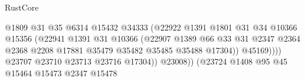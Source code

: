 \begin{lexlean}{RustCore}
\begin{coremodule}
                                                  @1809
                                                  @31
                                                  @35
                                                  @6314
                                                  @15432
                                                  @34333
                                                  (@22922
                                                    @1391
                                                    @1801
                                                    @31
                                                    @34
                                                    @10366
                                                    @15356
                                                    (@22941
                                                      @1391
                                                      @31
                                                      @10366
                                                      (@22907
                                                        @1389
                                                        @66
                                                        @33
                                                        @31
                                                        @2347
                                                        @2364
                                                        @2368
                                                        @2208
                                                        @17881
                                                        @35479
                                                        @35482
                                                        @35485
                                                        @35488
                                                        @17304))
                                                    @45169))))
                                            @23707
                                            @23710
                                            @23713
                                            @23716
                                            @17304))
                                        @23008))
                                    (@23724
                                      @1408
                                      @95
                                      @45
                                      @15464
                                      @15473
                                      @2347
                                      @15478

\end{coremodule}
\end{lexlean}
